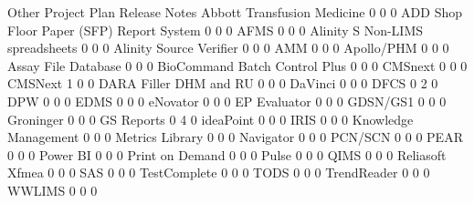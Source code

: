 \documentclass{article}
\begin{document}
\begin{Schunk}
\begin{Soutput}
                                           Other Project Plan Release Notes
  Abbott Transfusion Medicine                  0            0             0
  ADD Shop Floor Paper (SFP) Report System     0            0             0
  AFMS                                         0            0             0
  Alinity S Non-LIMS spreadsheets              0            0             0
  Alinity Source Verifier                      0            0             0
  AMM                                          0            0             0
  Apollo/PHM                                   0            0             0
  Assay File Database                          0            0             0
  BioCommand Batch Control Plus                0            0             0
  CMSnext                                      0            0             0
  CMSNext                                      1            0             0
  DARA Filler DHM and RU                       0            0             0
  DaVinci                                      0            0             0
  DFCS                                         0            2             0
  DPW                                          0            0             0
  EDMS                                         0            0             0
  eNovator                                     0            0             0
  EP Evaluator                                 0            0             0
  GDSN/GS1                                     0            0             0
  Groninger                                    0            0             0
  GS Reports                                   0            4             0
  ideaPoint                                    0            0             0
  IRIS                                         0            0             0
  Knowledge Management                         0            0             0
  Metrics Library                              0            0             0
  Navigator                                    0            0             0
  PCN/SCN                                      0            0             0
  PEAR                                         0            0             0
  Power BI                                     0            0             0
  Print on Demand                              0            0             0
  Pulse                                        0            0             0
  QIMS                                         0            0             0
  Reliasoft Xfmea                              0            0             0
  SAS                                          0            0             0
  TestComplete                                 0            0             0
  TODS                                         0            0             0
  TrendReader                                  0            0             0
  WWLIMS                                       0            0             0


\end{Soutput}
\end{Schunk}
\end{document}
